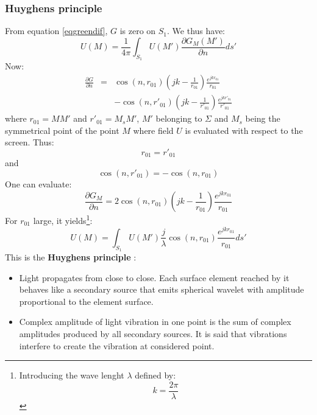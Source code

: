 \documentclass[12pt]{book}
\begin{document}
\subsubsection{Huyghens principle}\label{secHuyghens}
From equation \ref{eqgreendif}, $G$ is zero on $S_1$.
We thus have:
\begin{equation}
U(M)=\frac{1}{4\pi}\int_{S_1}U(M')\frac{\partial G_M(M')}{\partial n}ds'
\end{equation}
Now:
\begin{eqnarray}
\frac{\partial G}{\partial n}&=&\cos
(n,r_{01})(jk-\frac{1}{r_{01}})\frac{e^{jkr_{01}}}{r_{01}}\\
&&-\cos(n,r'_{01})(jk-\frac{1}{r'_{01}})\frac{e^{jkr'_{01}}}{r'_{01}}
\end{eqnarray}
where $r_{01}=MM'$ and $r'_{01}=M_sM'$, $M'$ belonging to $\Sigma$ and
$M_s$ being the symmetrical point of the point $M$ where field $U$ is
evaluated with respect to the screen. Thus:
\begin{equation}
r_{01}=r'_{01}
\end{equation}
and
\begin{equation}
\cos(n,r'_{01})=-\cos(n,r_{01})
\end{equation}
One can evaluate:
\begin{equation}
\frac{\partial G_M}{\partial n}=
2\cos(n,r_{01})(jk-\frac{1}{r_{01}})\frac{e^{jkr_{01}}}{r_{01}}
\end{equation}
For $r_{01}$ large, it yields\footnote{Introducing the wave lenght
$\lambda$ defined by:
\begin{equation}
k=\frac{2\pi}{\lambda}
\end{equation}
}:
\begin{equation}
U(M)=\int_{S_1}U(M')\frac{j}{\lambda}\cos(n,r_{01})
\frac{e^{jkr_{01}}}{r_{01}}ds' 
\end{equation}
This is the {\bf Huyghens principle} :
\begin{prin}
\begin{itemize}
\item Light propagates from close to close. Each surface element reached by it
  behaves like a secondary source that emits spherical wavelet with amplitude
  proportional to the element surface.
\item Complex amplitude of light vibration in one point is the sum of complex
  amplitudes produced by all secondary sources. It is said that vibrations
  interfere to create the vibration at considered point.
\end{itemize}
\end{prin}
\end{document}
